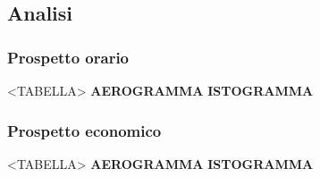 \subsection{Analisi}

\subsubsection{Prospetto orario}

<TABELLA>
\textbf{AEROGRAMMA}
\textbf{ISTOGRAMMA}

\subsubsection{Prospetto economico}

<TABELLA>
\textbf{AEROGRAMMA}
\textbf{ISTOGRAMMA}

